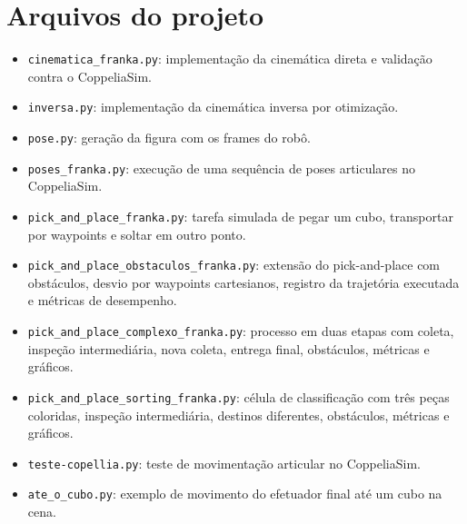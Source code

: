 \documentclass{article}
\begin{document}
\section{Arquivos do projeto}

\begin{itemize}
    \item \texttt{cinematica\_franka.py}: implementação da cinemática direta e validação contra o CoppeliaSim.
    \item \texttt{inversa.py}: implementação da cinemática inversa por otimização.
    \item \texttt{pose.py}: geração da figura com os frames do robô.
    \item \texttt{poses\_franka.py}: execução de uma sequência de poses articulares no CoppeliaSim.
    \item \texttt{pick\_and\_place\_franka.py}: tarefa simulada de pegar um cubo, transportar por waypoints e soltar em outro ponto.
    \item \texttt{pick\_and\_place\_obstaculos\_franka.py}: extensão do pick-and-place com obstáculos, desvio por waypoints cartesianos, registro da trajetória executada e métricas de desempenho.
    \item \texttt{pick\_and\_place\_complexo\_franka.py}: processo em duas etapas com coleta, inspeção intermediária, nova coleta, entrega final, obstáculos, métricas e gráficos.
    \item \texttt{pick\_and\_place\_sorting\_franka.py}: célula de classificação com três peças coloridas, inspeção intermediária, destinos diferentes, obstáculos, métricas e gráficos.
    \item \texttt{teste-copellia.py}: teste de movimentação articular no CoppeliaSim.
    \item \texttt{ate\_o\_cubo.py}: exemplo de movimento do efetuador final até um cubo na cena.
\end{itemize}
\end{document}

